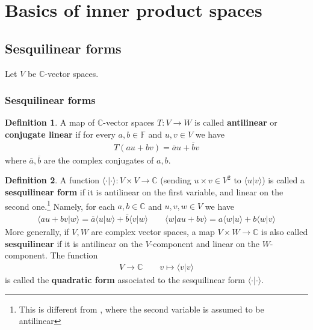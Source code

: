 \documentclass[12pt,b5paper,notitlepage]{article}
\theoremstyle{definition}
\newtheorem{df}{Definition}[section]
\theoremstyle{plain}
\newcommand{\ovl}{\overline}
\newcommand{\bk}[1]{\langle {#1}\rangle}
\newcommand{\Cbb}{\mathbb C}
\newcommand{\Fbb}{\mathbb F}
\numberwithin{equation}{section}
\begin{document}
\section{Basics of inner product spaces}




\subsection{Sesquilinear forms}



Let $V$ be $\Cbb$-vector spaces.



\subsubsection{Sesquilinear forms}



\begin{df}
A map of $\Cbb$-vector spaces $T:V\rightarrow W$ is called \textbf{antilinear} or \textbf{conjugate linear}  if for every $a,b\in\Fbb$ and $u,v\in V$ we have
\begin{align*}
T(au+bv)=\ovl au+\ovl bv
\end{align*}
where $\ovl a,\ovl b$ are the complex conjugates of $a,b$.
\end{df}


\begin{df}
A function $\bk{\cdot|\cdot}:V\times V\rightarrow\Cbb$ (sending $u\times v\in V^2$ to $\bk{u|v}$) is called a \textbf{sesquilinear form}  if it is antilinear on the first variable, and linear on the second one.\footnote{This is different from \cite{Gui-A}, where the second variable is assumed to be antilinear} Namely, for each $a,b\in\Cbb$ and $u,v,w\in V$ we have
\begin{gather*}
\bk{au+bv|w}=\ovl a\bk{u|w}+\ovl b\bk{v|w}\qquad \bk{w|au+bv}=a\bk{w|u}+b\bk{w|v}
\end{gather*}
More generally, if $V,W$ are complex vector spaces, a map $V\times W\rightarrow\Cbb$ is also called \textbf{sesquilinear} if it is antilinear on the $V$-component and linear on the $W$-component. The function
\begin{align*}
V\rightarrow\Cbb\qquad v\mapsto\bk{v|v}
\end{align*}
is called the \textbf{quadratic form}  associated to the sesquilinear form $\bk{\cdot|\cdot}$.
\end{df}
\end{document}
